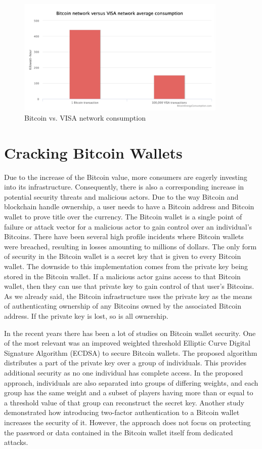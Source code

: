 \documentclass{article}
\begin{document}
\begin{figure}[H]
    \centering
    \includegraphics[width=10cm]{images/16.png}
    \caption{Bitcoin vs. VISA network consumption}
\end{figure}
\clearpage

\section*{Cracking Bitcoin Wallets}
Due to the increase of the Bitcoin value, more consumers are eagerly investing into its infrastructure. Consequently, there is also a corresponding increase in potential security threats and malicious actors. Due to the way Bitcoin and blockchain handle ownership, a user needs to have a Bitcoin address and Bitcoin wallet to prove title over the currency.\newline
The Bitcoin wallet is a single point of failure or attack vector for a malicious actor to gain control over an individual’s Bitcoins. There have been several high profile incidents where Bitcoin wallets were breached, resulting in losses amounting to millions of dollars. The only form of security in the Bitcoin wallet is a secret key that is given to every Bitcoin wallet. The downside to this implementation comes from the private key being stored in the Bitcoin wallet. If a malicious actor gains access to that Bitcoin wallet, then they can use that private key to gain control of that user’s Bitcoins. As we already said, the Bitcoin infrastructure uses the private key as the means of authenticating ownership of any Bitcoins owned by the associated Bitcoin address. If the private key is lost, so is all ownership.\par\noindent
In the recent years there has been a lot of studies on Bitcoin wallet security. One of the most relevant was an improved weighted threshold Elliptic Curve Digital Signature Algorithm (ECDSA) to secure Bitcoin wallets. The proposed algorithm distributes a part of the private key over a group of individuals. This provides additional security as no one individual has complete access. In the proposed approach, individuals are also separated into groups of differing weights, and each group has the same weight and a subset of players having more than or equal to a threshold value of that group can reconstruct the secret key.\newline
Another study demonstrated how introducing two-factor authentication to a Bitcoin wallet increases the security of it. However, the approach does not focus on protecting the password or data contained in the Bitcoin wallet itself from dedicated attacks.
\end{document}
